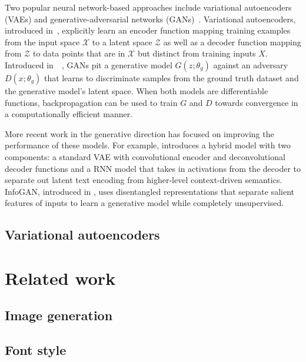 Two popular neural network-based approaches include variational autoencoders (VAEs) and generative-adversarial networks (GANs)~\cite{karpathy2016generative}. Variational autoencoders, introduced in~\cite{kingma2013auto}, explicitly learn an encoder function mapping training examples from the input space $\mathcal{X}$ to a latent space $\mathcal{Z}$ as well as a decoder function mapping from $\mathcal{Z}$ to data points that are in $\mathcal{X}$ but distinct from training inputs $X$. Introduced in~\citeyear{goodfellow2014generative}~\cite{goodfellow2014generative}, GANs pit a generative model $G(z; \theta_g)$ against an adversary $D(x; \theta_g)$ that learns to discriminate samples from the ground truth dataset and the generative model's latent space. When both models are differentiable functions, backpropagation can be used to train $G$ and $D$ towards convergence in a computationally efficient manner.

More recent work in the generative direction has focused on improving the performance of these models. For example, \cite{semeniuta2017hybrid} introduces a hybrid model with two components: a standard VAE with convolutional encoder and deconvolutional decoder functions and a RNN model that takes in activations from the decoder to separate out latent text encoding from higher-level context-driven semantics. InfoGAN, introduced in \cite{chen2016infogan}, uses disentangled representations that separate salient features of inputs to learn a generative model while completely unsupervised.

\subsection{Variational autoencoders}

\section{Related work}
\subsection{Image generation}
\subsection{Font style}
